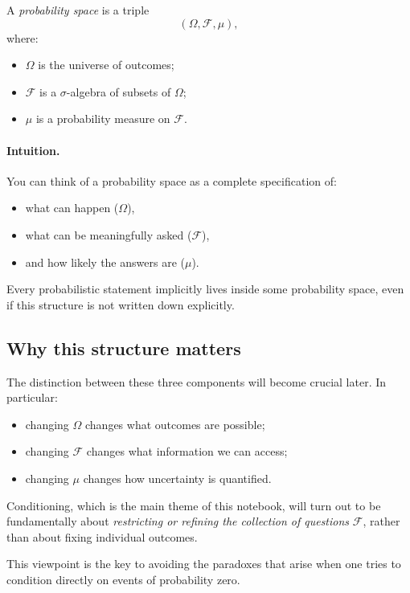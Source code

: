 \documentclass[11pt]{article}
\theoremstyle{remark}
\begin{document}
A \emph{probability space} is a triple
\[
(\Omega,\mathcal{F},\mu),
\]
where:
\begin{itemize}
\item \(\Omega\) is the universe of outcomes;
\item \(\mathcal{F}\) is a \(\sigma\)-algebra of subsets of \(\Omega\);
\item \(\mu\) is a probability measure on \(\mathcal{F}\).
\end{itemize}

\paragraph{Intuition.}
You can think of a probability space as a complete specification of:
\begin{itemize}
\item what can happen (\(\Omega\)),
\item what can be meaningfully asked (\(\mathcal{F}\)),
\item and how likely the answers are (\(\mu\)).
\end{itemize}

Every probabilistic statement implicitly lives inside some probability space,
even if this structure is not written down explicitly.

\medskip

\subsection{Why this structure matters}

The distinction between these three components will become crucial later.
In particular:
\begin{itemize}
\item changing \(\Omega\) changes what outcomes are possible;
\item changing \(\mathcal{F}\) changes what information we can access;
\item changing \(\mu\) changes how uncertainty is quantified.
\end{itemize}

Conditioning, which is the main theme of this notebook, will turn out to be
fundamentally about \emph{restricting or refining the collection of questions}
\(\mathcal{F}\), rather than about fixing individual outcomes.

This viewpoint is the key to avoiding the paradoxes that arise when one tries
to condition directly on events of probability zero.
\end{document}
